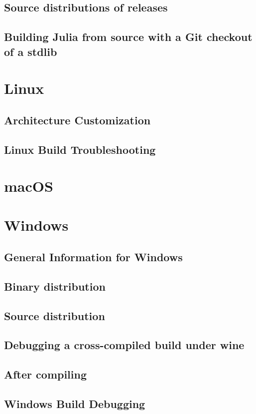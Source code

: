     \subsection{Source distributions of releases}
    \subsection{Building Julia from source with a Git checkout of a stdlib}
    \section{Linux}
    \subsection{Architecture Customization}
    \subsection{Linux Build Troubleshooting}
    \section{macOS}
    \section{Windows}
    \subsection{General Information for Windows}
    \subsection{Binary distribution}
    \subsection{Source distribution}
    \subsection{Debugging a cross-compiled build under wine}
    \subsection{After compiling}
    \subsection{Windows Build Debugging}
